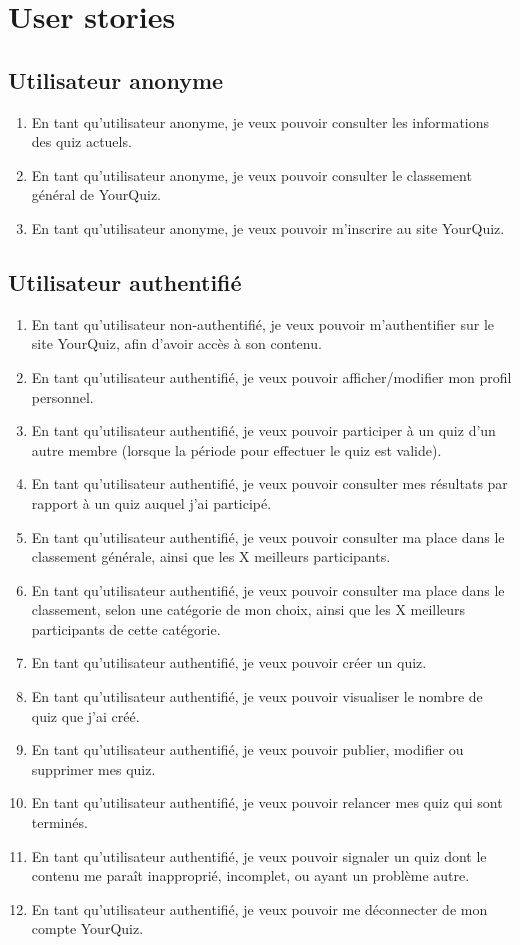 \documentclass[a4paper, 12pt]{article}
\begin{document}
\section{User stories}
\subsection{Utilisateur anonyme}
\begin{enumerate}
    \item En tant qu'utilisateur anonyme, je veux pouvoir consulter les informations des quiz actuels.
    \item En tant qu'utilisateur anonyme, je veux pouvoir consulter le classement général de YourQuiz.
    \item En tant qu'utilisateur anonyme, je veux pouvoir m'inscrire au site YourQuiz.
\end{enumerate}
\subsection{Utilisateur authentifié}
\begin{enumerate}
    \item En tant qu'utilisateur non-authentifié, je veux pouvoir m'authentifier sur le site YourQuiz, afin d'avoir accès à son contenu.
    \item En tant qu'utilisateur authentifié, je veux pouvoir afficher/modifier mon profil personnel.
    \item En tant qu'utilisateur authentifié, je veux pouvoir participer à un quiz d'un autre membre (lorsque la période pour effectuer le quiz est valide).
    \item En tant qu'utilisateur authentifié, je veux pouvoir consulter mes résultats par rapport à un quiz auquel j'ai participé.
    \item En tant qu'utilisateur authentifié, je veux pouvoir consulter ma place dans le classement générale, ainsi que les X meilleurs participants.
    \item En tant qu'utilisateur authentifié, je veux pouvoir consulter ma place dans le classement, selon une catégorie de mon choix, ainsi que les X meilleurs participants de cette catégorie.
    \item En tant qu'utilisateur authentifié, je veux pouvoir créer un quiz.
    \item En tant qu'utilisateur authentifié, je veux pouvoir visualiser le nombre de quiz que j'ai créé.
    \item En tant qu'utilisateur authentifié, je veux pouvoir publier, modifier ou supprimer mes quiz.
    \item En tant qu'utilisateur authentifié, je veux pouvoir relancer mes quiz qui sont terminés.
    \item En tant qu'utilisateur authentifié, je veux pouvoir signaler un quiz dont le contenu me paraît inapproprié, incomplet, ou ayant un problème autre.
    \item En tant qu'utilisateur authentifié, je veux pouvoir me déconnecter de mon compte YourQuiz.
\end{enumerate}
\end{document}
